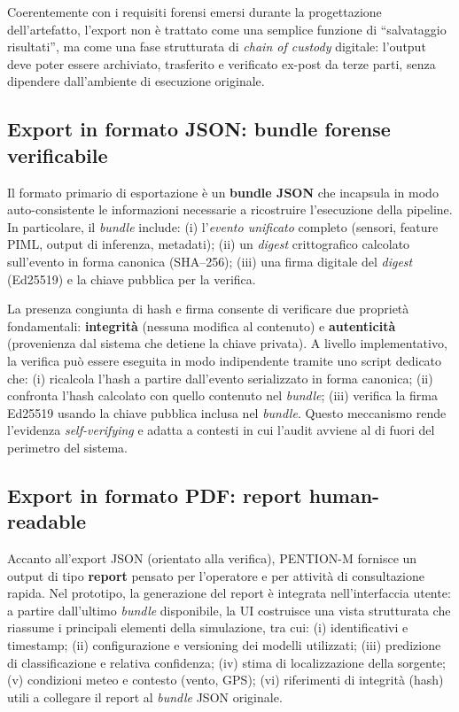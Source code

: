 Coerentemente con i requisiti forensi emersi durante la progettazione dell’artefatto, l’export non è trattato come una semplice funzione di ``salvataggio risultati'', ma come una fase strutturata di \emph{chain of custody} digitale: l’output deve poter essere archiviato, trasferito e verificato ex-post da terze parti, senza dipendere dall’ambiente di esecuzione originale.

\subsection{Export in formato JSON: bundle forense verificabile}

Il formato primario di esportazione è un \textbf{bundle JSON} che incapsula in modo auto-consistente le informazioni necessarie a ricostruire l’esecuzione della pipeline.
In particolare, il \textit{bundle} include:
(i) l’\emph{evento unificato} completo (sensori, feature PIML, output di inferenza, metadati);
(ii) un \textit{digest} crittografico calcolato sull’evento in forma canonica (SHA--256);
(iii) una firma digitale del \textit{digest} (Ed25519) e la chiave pubblica per la verifica.

La presenza congiunta di hash e firma consente di verificare due proprietà fondamentali:
\textbf{integrità} (nessuna modifica al contenuto) e \textbf{autenticità} (provenienza dal sistema che detiene la chiave privata).
A livello implementativo, la verifica può essere eseguita in modo indipendente tramite uno script dedicato che:
(i) ricalcola l’hash a partire dall’evento serializzato in forma canonica;
(ii) confronta l’hash calcolato con quello contenuto nel \textit{bundle};
(iii) verifica la firma Ed25519 usando la chiave pubblica inclusa nel \textit{bundle}.
Questo meccanismo rende l’evidenza \emph{self-verifying} e adatta a contesti in cui l’audit avviene al di fuori del perimetro del sistema.

\subsection{Export in formato PDF: report human-readable}

Accanto all’export JSON (orientato alla verifica), \textsc{PENTION-M} fornisce un output di tipo \textbf{report} pensato per l’operatore e per attività di consultazione rapida.
Nel prototipo, la generazione del report è integrata nell’interfaccia utente: a partire dall’ultimo \textit{bundle} disponibile, la UI costruisce una vista strutturata che riassume i principali elementi della simulazione, tra cui:
(i) identificativi e timestamp;
(ii) configurazione e versioning dei modelli utilizzati;
(iii) predizione di classificazione e relativa confidenza;
(iv) stima di localizzazione della sorgente;
(v) condizioni meteo e contesto (vento, GPS);
(vi) riferimenti di integrità (hash) utili a collegare il report al \textit{bundle} JSON originale.

